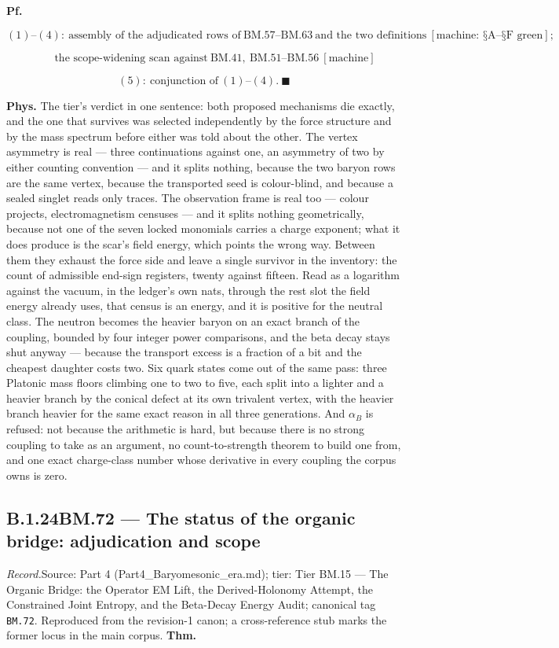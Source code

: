 \documentclass[11pt,openany]{report}
\theoremstyle{canonplain}
\theoremstyle{canondef}
\begin{document}
\textbf{Pf.}

\[
(1)\text{--}(4):\ \text{assembly of the adjudicated rows of}\ \mathrm{BM.57}\text{--}\mathrm{BM.63}\ \text{and the two definitions}\ [\text{machine: §A--§F green}];
\]

\[
\qquad \text{the scope-widening scan against}\ \mathrm{BM.41},\ \mathrm{BM.51}\text{--}\mathrm{BM.56}\ [\text{machine}]
\]

\[
(5):\ \text{conjunction of}\ (1)\text{--}(4). \ \blacksquare
\]

\textbf{Phys.} The tier's verdict in one sentence: both proposed mechanisms die exactly, and the one that survives was selected independently by the force structure and by the mass spectrum before either was told about the other. The vertex asymmetry is real — three continuations against one, an asymmetry of two by either counting convention — and it splits nothing, because the two baryon rows are the same vertex, because the transported seed is colour-blind, and because a sealed singlet reads only traces. The observation frame is real too — colour projects, electromagnetism censuses — and it splits nothing geometrically, because not one of the seven locked monomials carries a charge exponent; what it does produce is the scar's field energy, which points the wrong way. Between them they exhaust the force side and leave a single survivor in the inventory: the count of admissible end-sign registers, twenty against fifteen. Read as a logarithm against the vacuum, in the ledger's own nats, through the rest slot the field energy already uses, that census is an energy, and it is positive for the neutral class. The neutron becomes the heavier baryon on an exact branch of the coupling, bounded by four integer power comparisons, and the beta decay stays shut anyway — because the transport excess is a fraction of a bit and the cheapest daughter costs two. Six quark states come out of the same pass: three Platonic mass floors climbing one to two to five, each split into a lighter and a heavier branch by the conical defect at its own trivalent vertex, with the heavier branch heavier for the same exact reason in all three generations. And $\alpha_B$ is refused: not because the arithmetic is hard, but because there is no strong coupling to take as an argument, no count-to-strength theorem to build one from, and one exact charge-class number whose derivative in every coupling the corpus owns is zero.

\medskip
\subsection*{\texorpdfstring{B.1.24\quad BM.72 — The status of the organic bridge: adjudication and scope}{BM.72 B.1.24}}
\label{tag:BM-72}
{\small \textit{Record.}\quad Source: Part 4 (Part4\_Baryomesonic\_era.md); tier: Tier BM.15 — The Organic Bridge: the Operator EM Lift, the Derived-Holonomy Attempt, the Constrained Joint Entropy, and the Beta-Decay Energy Audit; canonical tag \texttt{BM.72}. Reproduced from the revision-1 canon; a cross-reference stub marks the former locus in the main corpus.}
\medskip
\textbf{Thm.}
\end{document}

